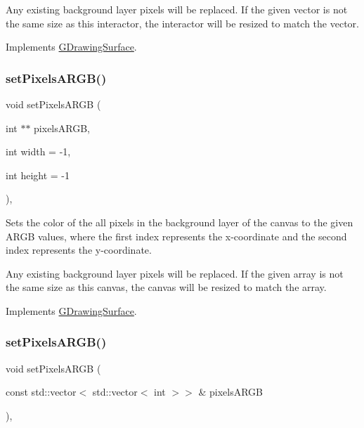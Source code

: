 Any existing background layer pixels will be replaced. If the given vector is not the same size as this interactor, the interactor will be resized to match the vector. 

Implements \mbox{\hyperlink{classsgl_1_1GDrawingSurface_a2c6a1d92542ef94306ea5dbcc11c8fdb}{G\+Drawing\+Surface}}.

\mbox{\label{classsgl_1_1GCanvas_a7f69ab7e71de88d5fab2be7561b9a5e1}} 
\subsubsection{\texorpdfstring{set\+Pixels\+A\+R\+G\+B()}{setPixelsARGB()}\hspace{0.1cm}{\footnotesize\ttfamily [1/2]}}
{\footnotesize\ttfamily void set\+Pixels\+A\+R\+GB (\begin{DoxyParamCaption}\item[{int $\ast$$\ast$}]{pixels\+A\+R\+GB,  }\item[{int}]{width = {\ttfamily -\/1},  }\item[{int}]{height = {\ttfamily -\/1} }\end{DoxyParamCaption})\hspace{0.3cm}{\ttfamily [override]}, {\ttfamily [virtual]}}



Sets the color of the all pixels in the background layer of the canvas to the given A\+R\+GB values, where the first index represents the x-\/coordinate and the second index represents the y-\/coordinate. 

Any existing background layer pixels will be replaced. If the given array is not the same size as this canvas, the canvas will be resized to match the array. 

Implements \mbox{\hyperlink{classsgl_1_1GDrawingSurface_a6d30ea30c0de2b983909be1438003ff1}{G\+Drawing\+Surface}}.

\mbox{\label{classsgl_1_1GCanvas_a8183dc852e94c60d374eb26749c4378e}} 
\subsubsection{\texorpdfstring{set\+Pixels\+A\+R\+G\+B()}{setPixelsARGB()}\hspace{0.1cm}{\footnotesize\ttfamily [2/2]}}
{\footnotesize\ttfamily void set\+Pixels\+A\+R\+GB (\begin{DoxyParamCaption}\item[{const std\+::vector$<$ std\+::vector$<$ int $>$$>$ \&}]{pixels\+A\+R\+GB }\end{DoxyParamCaption})\hspace{0.3cm}{\ttfamily [override]}, {\ttfamily [virtual]}}



